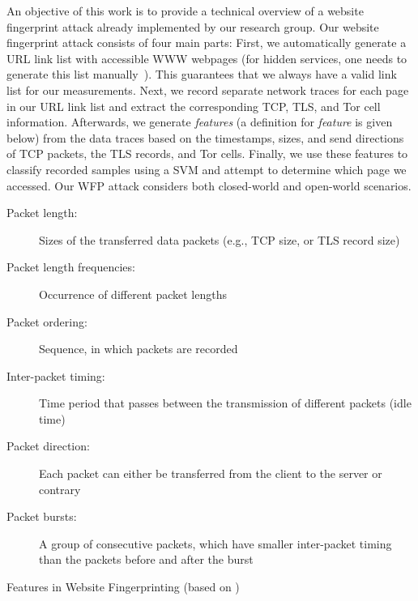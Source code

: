 An objective of this work is to provide a technical overview of a website fingerprint attack already implemented by our research group. Our website fingerprint attack consists of four main parts: First, we automatically generate a \ac{URL} link list with accessible \acs{WWW} webpages (for hidden services, one needs to generate this list manually~\cite{Mitseva2015}). This guarantees that we always have a valid link list for our measurements. Next, we record separate network traces for each page in our \ac{URL} link list and extract the corresponding \ac{TCP}, \ac{TLS}, and Tor cell information. Afterwards, we generate \emph{features} (a definition for \emph{feature} is given below) from the data traces based on the timestamps, sizes, and send directions of \ac{TCP} packets, the \ac{TLS} records, and Tor cells. Finally, we use these features to classify recorded samples using a \ac{SVM} and attempt to determine which page we accessed. Our \ac{WFP} attack considers both closed-world and open-world scenarios.

\begin{listing}[t]
\centering
\begin{minipage}[b]{.85\textwidth}
\begin{description}
	\item[Packet length:] Sizes of the transferred data packets (e.g., \ac{TCP} size, or \ac{TLS} record size)
	\item[Packet length frequencies:] Occurrence of different packet lengths 
	\item[Packet ordering:] Sequence, in which packets are recorded
	\item[Inter-packet timing:] Time period that passes between the transmission of different packets (idle time)
	\item[Packet direction:] Each packet can either be transferred from the client to the server or contrary
	\item[Packet bursts:] A group of consecutive packets, which have smaller inter-packet timing than the packets before and after the burst\\
\end{description}
\end{minipage}
\caption{Features in Website Fingerprinting (based on \cite{Pennekamp2014})}
\label{lst:features}
\end{listing}

